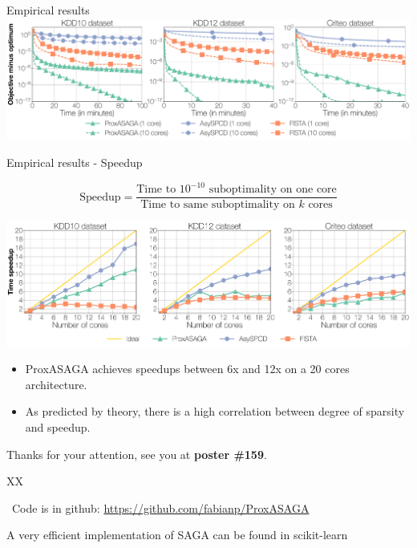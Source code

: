 \documentclass[10pt]{beamer}
\begin{document}
\begin{frame}{Empirical results}
\includegraphics[width=1\linewidth]{img/prox_asaga_1}

\end{frame}


\begin{frame}{Empirical results - Speedup}

$$
\text{Speedup} = \frac{\text{Time to $10^{-10}$ suboptimality 
on one core}}{\text{Time to same suboptimality on $k$ cores}}
$$

\includegraphics[width=\linewidth]{img/prox_asaga_2}

\begin{itemize}
\pause \item ProxASAGA achieves speedups between 6x and 12x on a 20 cores architecture.

\pause \vspace{0.5em}\item As predicted by theory, there is a high correlation between degree of sparsity and speedup.
\end{itemize}

\pause Thanks for your attention, see you at {\bfseries poster \#159}.
\end{frame}

\begin{frame}{XX}

\faGithub~Code is in github: \url{https://github.com/fabianp/ProxASAGA}

A very efficient implementation of SAGA can be found in scikit-learn
\end{frame}





\begin{frame}
\nocite{pedregosa2017proxasaga}
  \printbibliography
 \end{frame}
\end{document}
